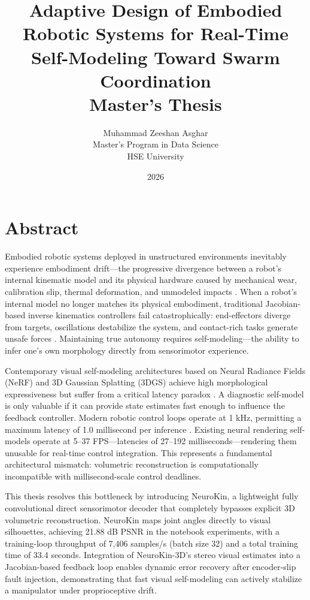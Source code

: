 \documentclass[12pt,a4paper,oneside]{report}
\title{
    \vspace{2cm}
    \textbf{\Large Adaptive Design of Embodied Robotic Systems for Real-Time Self-Modeling Toward Swarm Coordination} \\
    \vspace{1cm}
    \large Master's Thesis
}
\author{
    Muhammad Zeeshan Asghar \\
    Master's Program in Data Science \\
    HSE University
}
\date{\vspace{1cm} 2026}
\begin{document}
\maketitle
\clearpage

\chapter*{Abstract}

Embodied robotic systems deployed in unstructured environments inevitably experience embodiment drift—the progressive divergence between a robot's internal kinematic model and its physical hardware caused by mechanical wear, calibration slip, thermal deformation, and unmodeled impacts \cite{bongard2006resilient, cully2015robots}. When a robot's internal model no longer matches its physical embodiment, traditional Jacobian-based inverse kinematics controllers fail catastrophically: end-effectors diverge from targets, oscillations destabilize the system, and contact-rich tasks generate unsafe forces \cite{kwiatkowski2019task, chen2022full}. Maintaining true autonomy requires self-modeling—the ability to infer one's own morphology directly from sensorimotor experience.

Contemporary visual self-modeling architectures based on Neural Radiance Fields (NeRF) and 3D Gaussian Splatting (3DGS) achieve high morphological expressiveness but suffer from a critical latency paradox \cite{hu2024teaching, hu2025learning}. A diagnostic self-model is only valuable if it can provide state estimates fast enough to influence the feedback controller. Modern robotic control loops operate at 1 kHz, permitting a maximum latency of 1.0 millisecond per inference \cite{siciliano2009robotics}. Existing neural rendering self-models operate at 5–37 FPS—latencies of 27–192 milliseconds—rendering them unusable for real-time control integration. This represents a fundamental architectural mismatch: volumetric reconstruction is computationally incompatible with millisecond-scale control deadlines.

This thesis resolves this bottleneck by introducing NeuroKin, a lightweight fully convolutional direct sensorimotor decoder that completely bypasses explicit 3D volumetric reconstruction. NeuroKin maps joint angles directly to visual silhouettes, achieving 21.88 dB PSNR in the notebook experiments, with a training-loop throughput of 7,406 samples/s (batch size 32) and a total training time of 33.4 seconds. Integration of NeuroKin-3D's stereo visual estimates into a Jacobian-based feedback loop enables dynamic error recovery after encoder-slip fault injection, demonstrating that fast visual self-modeling can actively stabilize a manipulator under proprioceptive drift.
\end{document}
